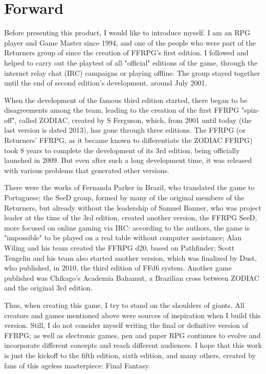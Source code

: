 \setcounter{secnumdepth}{0}
\setcounter{tocdepth}{0}

\section*{Forward}
\begin{multicols}{2}
Before presenting this product, I would like
to introduce myself. I am an RPG player and Game
Master since 1994, and one of the people who
were part of the Returners group of since the
creation of FFRPG’s first edition. I followed and
helped to carry out the playtest of all "official"
editions of the game, through the internet relay
chat (IRC) campaigns or playing offline. The group
stayed together until the end of second edition’s
development, around July 2001.

When the development of the famous third
edition started, there began to be disagreements
among the team, leading to the creation of the first
FFRPG "spin-off", called ZODIAC, created by S
Ferguson, which, from 2001 until today (the last
version is dated 2013), has gone through three
editions. The FFRPG (or Returners' FFRPG, as it
became known to differentiate the ZODIAC FFRPG)
took 8 years to complete the development of its
3rd edition, being officially launched in 2009. But
even after such a long development time, it was
released with various problems that generated
other versions.

There were the works of Fernanda Parker in
Brazil, who translated the game to Portuguese; the
SeeD group, formed by many of the original
members of the Returners, but already without the
leadership of Samuel Banner, who was project
leader at the time of the 3rd edition, created
another version, the FFRPG SeeD, more focused on
online gaming via IRC: according to the authors,
the game is "impossible" to be played on a real
table without computer assistance; Alan Wiling 
and his team created the FFRPG d20, based on
Pathfinder; Scott Tengelin and his team also
started another version, which was finalized by
Dust, who published, in 2010, the third edition of
FFd6 system. Another game published was
Chikago’s Academia Bahamut, a Brazilian cross
between ZODIAC and the original 3rd edition.

Thus, when creating this game, I try to stand
on the shoulders of giants. All creators and games
mentioned above were sources of inspiration
when I build this version. Still, I do not consider
myself writing the final or definitive version of
FFRPG; as well as electronic games, pen and paper
RPG continues to evolve and incorporate different
concepts and reach different audiences. I hope that
this work is just the kickoff to the fifth edition,
sixth edition, and many others, created by fans of
this ageless masterpiece: Final Fantasy.


\end{multicols}
